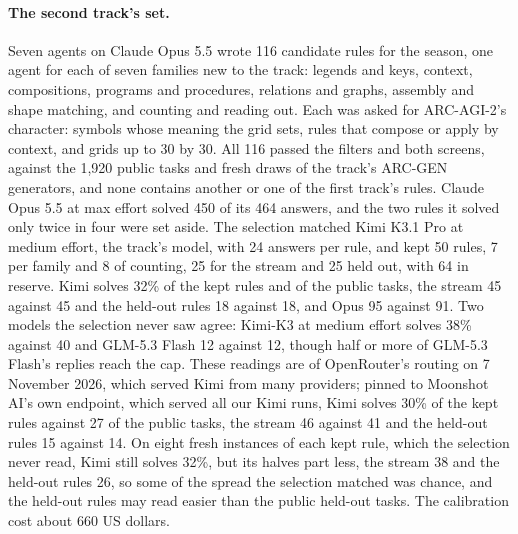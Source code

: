 \paragraph{The second track's set.} Seven agents on Claude Opus 5.5 wrote 116 candidate rules for the season, one agent for each of seven families new to the track: legends and keys, context, compositions, programs and procedures, relations and graphs, assembly and shape matching, and counting and reading out. Each was asked for ARC-AGI-2's character: symbols whose meaning the grid sets, rules that compose or apply by context, and grids up to 30 by 30. All 116 passed the filters and both screens, against the 1{,}920 public tasks and fresh draws of the track's ARC-GEN generators, and none contains another or one of the first track's rules. Claude Opus 5.5 at max effort solved 450 of its 464 answers, and the two rules it solved only twice in four were set aside. The selection matched Kimi K3.1 Pro at medium effort, the track's model, with 24 answers per rule, and kept 50 rules, 7 per family and 8 of counting, 25 for the stream and 25 held out, with 64 in reserve. Kimi solves 32\% of the kept rules and of the public tasks, the stream 45 against 45 and the held-out rules 18 against 18, and Opus 95 against 91. Two models the selection never saw agree: Kimi-K3 at medium effort solves 38\% against 40 and GLM-5.3 Flash 12 against 12, though half or more of GLM-5.3 Flash's replies reach the cap. These readings are of OpenRouter's routing on 7 November 2026, which served Kimi from many providers; pinned to Moonshot AI's own endpoint, which served all our Kimi runs, Kimi solves 30\% of the kept rules against 27 of the public tasks, the stream 46 against 41 and the held-out rules 15 against 14. On eight fresh instances of each kept rule, which the selection never read, Kimi still solves 32\%, but its halves part less, the stream 38 and the held-out rules 26, so some of the spread the selection matched was chance, and the held-out rules may read easier than the public held-out tasks. The calibration cost about 660 US dollars.

